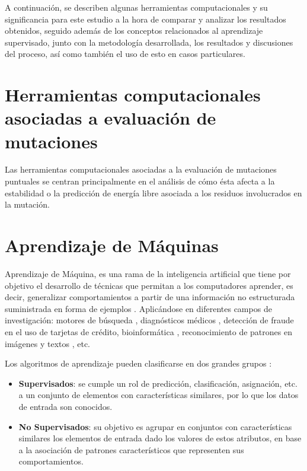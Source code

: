 A continuación, se describen algunas herramientas computacionales y su significancia para este estudio a la hora de comparar y analizar los resultados obtenidos, seguido además de los conceptos relacionados al aprendizaje supervisado, junto con la metodología desarrollada, los resultados y discusiones del proceso, así como también el uso de esto en casos particulares.


\section{Herramientas computacionales asociadas a evaluación de mutaciones}

Las herramientas computacionales asociadas a la evaluación de mutaciones puntuales se centran principalmente en el análisis de cómo ésta afecta a la estabilidad o la predicción de energía libre asociada a los residuos involucrados en la mutación.

\section{Aprendizaje de Máquinas}

Aprendizaje de Máquina, es una rama de la inteligencia artificial que tiene por objetivo el desarrollo de técnicas que permitan a los computadores aprender, es decir, generalizar comportamientos a partir de una información no estructurada suministrada en forma de ejemplos \cite{michie1994machine}. Aplicándose en diferentes campos de investigación: motores de búsqueda \cite{cooley1997web}, diagnósticos médicos \cite{7912315,ABDELAZIZ2018117}, detección de fraude en el uso de tarjetas de crédito, bioinformática \cite{juanito}, reconocimiento de patrones en imágenes \cite{imageA} y textos \cite{netzer2011reading,alm2005emotions}, etc. 


Los algoritmos de aprendizaje pueden clasificarse en dos grandes grupos \cite{michie1994machine}:

\begin{itemize}
	
	\item \textbf{Supervisados}: se cumple un rol de predicción, clasificación, asignación, etc. a un conjunto de elementos con características similares, por lo que los datos de entrada son conocidos.
	
	\item \textbf{No Supervisados}: su objetivo es agrupar en conjuntos con características similares los elementos de entrada dado los valores de estos atributos, en base a la asociación de patrones característicos que representen sus comportamientos.
\end{itemize}


